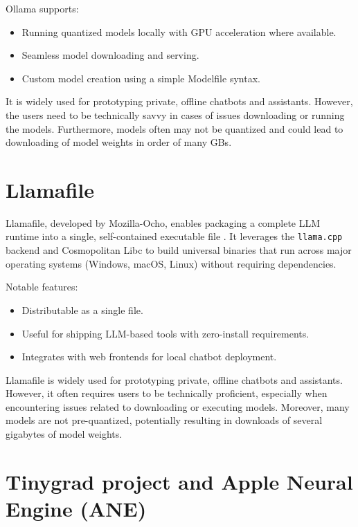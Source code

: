 Ollama supports:
\begin{itemize}
    \item Running quantized models locally with GPU acceleration where available.
    \item Seamless model downloading and serving.
    \item Custom model creation using a simple Modelfile syntax.
\end{itemize}

It is widely used for prototyping private, offline chatbots and assistants. However, the users need to be technically savvy in cases of issues downloading or running the models. Furthermore, models often may not be quantized and could lead to downloading of model weights in order of many GBs.


\section{Llamafile}
\label{sec:llamafile}


Llamafile, developed by Mozilla-Ocho, enables packaging a complete LLM runtime into a single, self-contained executable file \cite{llamafile}. It leverages the \texttt{llama.cpp} backend and Cosmopolitan Libc to build universal binaries that run across major operating systems (Windows, macOS, Linux) without requiring dependencies.

Notable features:
\begin{itemize}
    \item Distributable as a single file.
    \item Useful for shipping LLM-based tools with zero-install requirements.
    \item Integrates with web frontends for local chatbot deployment.
\end{itemize}

Llamafile is widely used for prototyping private, offline chatbots and assistants. However, it often requires users to be technically proficient, especially when encountering issues related to downloading or executing models. Moreover, many models are not pre-quantized, potentially resulting in downloads of several gigabytes of model weights.
\section{Tinygrad project and Apple Neural Engine (ANE)}
\label{sec:ANEAPI}

